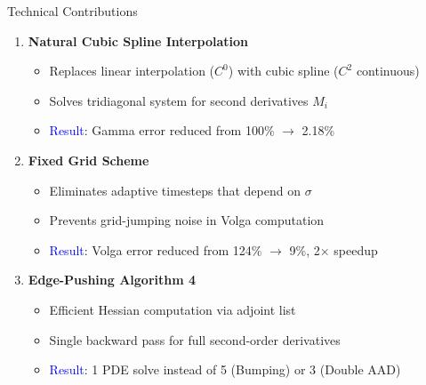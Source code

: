 \documentclass[aspectratio=169]{beamer}
\begin{document}
\begin{frame}{Technical Contributions}
\begin{enumerate}
    \item \textbf{Natural Cubic Spline Interpolation}
    \begin{itemize}
        \item Replaces linear interpolation ($C^0$) with cubic spline ($C^2$ continuous)
        \item Solves tridiagonal system for second derivatives $M_i$
        \item \textcolor{blue}{Result}: Gamma error reduced from 100\% $\rightarrow$ 2.18\%
    \end{itemize}

    \vspace{0.5em}
    \item \textbf{Fixed Grid Scheme}
    \begin{itemize}
        \item Eliminates adaptive timesteps that depend on $\sigma$
        \item Prevents grid-jumping noise in Volga computation
        \item \textcolor{blue}{Result}: Volga error reduced from 124\% $\rightarrow$ 9\%, 2$\times$ speedup
    \end{itemize}

    \vspace{0.5em}
    \item \textbf{Edge-Pushing Algorithm 4}
    \begin{itemize}
        \item Efficient Hessian computation via adjoint list
        \item Single backward pass for full second-order derivatives
        \item \textcolor{blue}{Result}: 1 PDE solve instead of 5 (Bumping) or 3 (Double AAD)
    \end{itemize}
\end{enumerate}
\end{frame}
\end{document}
